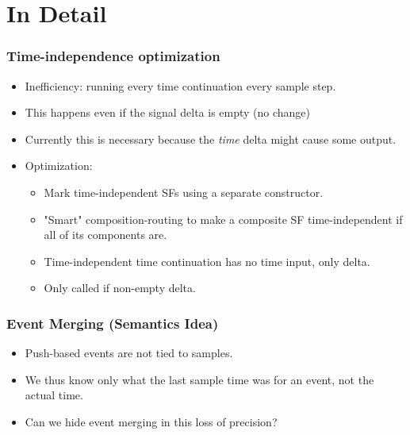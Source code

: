 \documentclass{beamer}
\begin{document}
\section{In Detail}

\begin{frame}
\frametitle{Time-independence optimization}
    \begin{itemize}
        \item Inefficiency: running every time continuation every sample step.
        \item This happens even if the signal delta is empty (no change)
        \item Currently this is necessary because the {\em time} delta might
              cause some output.
        \item Optimization:
        \begin{itemize}
            \item Mark time-independent SFs using a separate constructor.
            \item "Smart" composition-routing to make a composite SF time-independent
                  if all of its components are.
            \item Time-independent time continuation has no time input, only delta.
            \item Only called if non-empty delta. 
        \end{itemize}
    \end{itemize}
\end{frame}

\begin{frame}
\frametitle{Event Merging (Semantics Idea)}
    \begin{itemize}
        \item Push-based events are not tied to samples.
        \item We thus know only what the last sample time was for an event,
              not the actual time.
        \item Can we hide event merging in this loss of precision?
    \end{itemize}
\end{frame}
\end{document}
